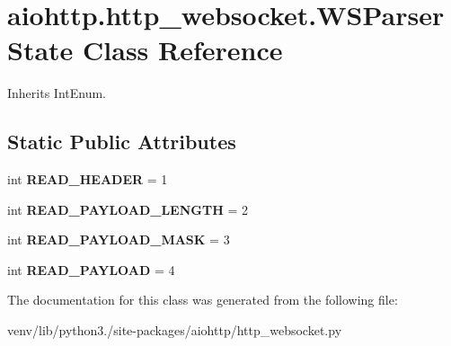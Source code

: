 \hypertarget{classaiohttp_1_1http__websocket_1_1_w_s_parser_state}{}\section{aiohttp.\+http\+\_\+websocket.\+W\+S\+Parser\+State Class Reference}
\label{classaiohttp_1_1http__websocket_1_1_w_s_parser_state}


Inherits Int\+Enum.

\subsection*{Static Public Attributes}
\begin{DoxyCompactItemize}
\item 
\mbox{\label{classaiohttp_1_1http__websocket_1_1_w_s_parser_state_a8742cb6bee3fca917389349a4d2a6567}} 
int {\bfseries R\+E\+A\+D\+\_\+\+H\+E\+A\+D\+ER} = 1
\item 
\mbox{\label{classaiohttp_1_1http__websocket_1_1_w_s_parser_state_a6c6ca33ca06e4c71ca1eb00107f120db}} 
int {\bfseries R\+E\+A\+D\+\_\+\+P\+A\+Y\+L\+O\+A\+D\+\_\+\+L\+E\+N\+G\+TH} = 2
\item 
\mbox{\label{classaiohttp_1_1http__websocket_1_1_w_s_parser_state_a35a5e6db66c6e9cf4beca694aed28d25}} 
int {\bfseries R\+E\+A\+D\+\_\+\+P\+A\+Y\+L\+O\+A\+D\+\_\+\+M\+A\+SK} = 3
\item 
\mbox{\label{classaiohttp_1_1http__websocket_1_1_w_s_parser_state_a8c0b5bcdc5a18e1d461d19c659ca5255}} 
int {\bfseries R\+E\+A\+D\+\_\+\+P\+A\+Y\+L\+O\+AD} = 4
\end{DoxyCompactItemize}


The documentation for this class was generated from the following file\+:\begin{DoxyCompactItemize}
\item 
venv/lib/python3./site-\/packages/aiohttp/http\+\_\+websocket.\+py\end{DoxyCompactItemize}
